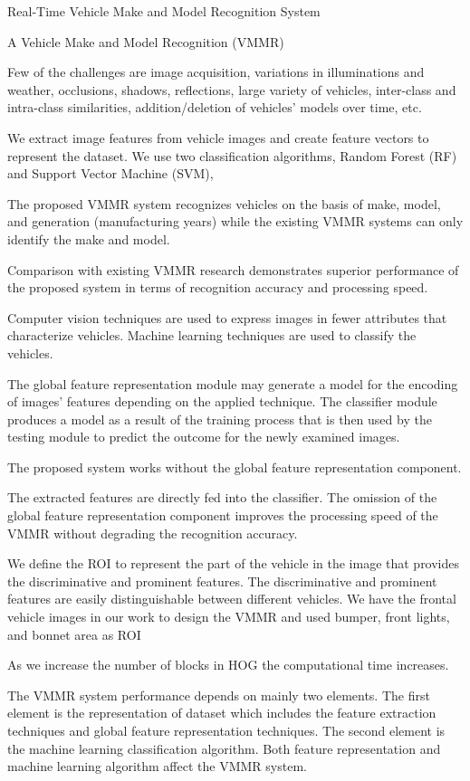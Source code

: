 Real-Time Vehicle Make and Model
Recognition System \cite{manzoor2019real}

A Vehicle Make and Model Recognition (VMMR) 

Few of the challenges are image acquisition, variations in illuminations and weather, occlusions, shadows,
reflections, large variety of vehicles, inter-class and intra-class similarities, addition/deletion of vehicles’
 models over time, etc. 


We extract image
features from vehicle images and create feature vectors to represent the dataset. 
We use two classification
algorithms, Random Forest (RF) and Support Vector Machine (SVM), 

The proposed VMMR system recognizes vehicles on the basis of make, model, and
generation (manufacturing years) while the existing VMMR systems can only identify the make and
model.

Comparison with existing VMMR research demonstrates superior performance of the proposed
system in terms of recognition accuracy and processing speed.


Computer vision techniques are used to express images in fewer attributes that characterize vehicles.
Machine learning techniques are used to classify the vehicles. 

The global
feature representation module may generate a model for the encoding of images’ features depending on
the applied technique.
The classifier module produces a model as a result of the training process
that is then used by the testing module to predict the outcome for the newly examined images. 

The proposed system works without the global feature representation
component. 

The extracted features are directly fed into the classifier. The omission of the global feature
representation component improves the processing speed of the VMMR without degrading the recognition
 accuracy.


We define the ROI to represent the part of the vehicle
in the image that provides the discriminative and prominent features. The discriminative and prominent
features are easily distinguishable between different vehicles. We have the frontal vehicle images in our
work to design the VMMR and used bumper, front lights, and bonnet area as ROI


As we increase the
number of blocks in HOG the computational time increases.

The VMMR system performance depends on mainly two elements. The first element is the
representation of dataset which includes the feature extraction techniques and global feature representation
techniques. The second element is the machine learning classification algorithm. Both feature
representation and machine learning algorithm affect the VMMR system. 

